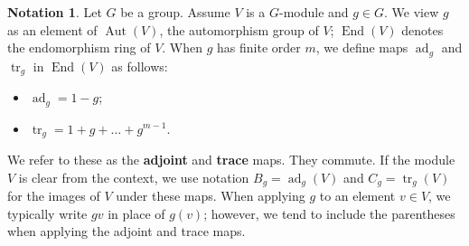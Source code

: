 \documentclass[a4paper, 11pt]{amsart}
\theoremstyle{plain}
\theoremstyle{definition}
\newtheorem*{notation}{Notation}
\theoremstyle{remark}
\DeclareMathOperator{\ad}{ad}
\DeclareMathOperator{\tr}{tr}
\DeclareMathOperator{\Aut}{Aut}
\DeclareMathOperator{\End}{End}
\begin{document}
\begin{notation}
Let $G$ be a group. Assume $V$ is a $G$-module and $g\in G$. We view $g$ as an element of $\Aut(V)$, the automorphism group of $V$;  $\End(V)$ denotes the endomorphism ring of $V$. When $g$ has finite order $m$, we define maps $\ad_g$ and $\tr_g$ in $\End(V)$ as follows:
\begin{itemize}
\item
$\ad_g = 1-g$;
\item
$\tr_g = 1 + g + \dots + g^{m-1}$.
\end{itemize}
We refer to these as the \textbf{adjoint} and \textbf{trace} maps. They commute.
If the module $V$ is clear from the context, we use notation $B_g = \ad_g(V)$ and $C_g = \tr_g(V)$ for the images of $V$ under these maps.
When applying $g$ to an element $v\in V$, we typically write $gv$ in place of $g(v)$; however, we tend to include the parentheses when applying the adjoint and trace maps.
\end{notation}

\end{document}
